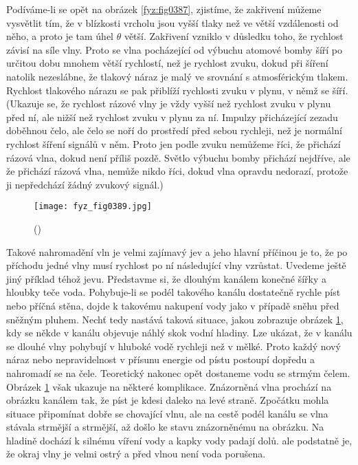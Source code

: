   Podíváme-li se opět na obrázek \ref{fyz:fig0387}, zjistíme, že zakřivení můžeme vysvětlit tím, že 
  v blízkosti vrcholu jsou vyšší tlaky než ve větší vzdálenosti od něho, a proto je tam úhel 
  \(\theta\) větší. Zakřivení vzniklo v důsledku toho, že rychlost závisí na síle vlny. Proto se 
  vlna pocházející od výbuchu atomové bomby šíří po určitou dobu mnohem větší rychlostí, než je 
  rychlost zvuku, dokud při šíření natolik nezeslábne, že tlakový náraz je malý ve srovnání s 
  atmosférickým tlakem. Rychlost tlakového nárazu se pak přiblíží rychlosti zvuku v plynu, v němž 
  se šíří. (Ukazuje se, že rychlost rázové vlny je vždy vyšší než rychlost zvuku v plynu před ní, 
  ale nižší než rychlost zvuku v plynu za ní. Impulzy přicházející zezadu doběhnou čelo, ale čelo 
  se noří do prostředí před sebou rychleji, než je normální rychlost šíření signálů v něm. Proto 
  jen podle zvuku nemůžeme říci, že přichází rázová vlna, dokud není příliš pozdě. Světlo výbuchu 
  bomby přichází nejdříve, ale že přichází rázová vlna, nemůže nikdo říci, dokud vlna opravdu 
  nedorazí, protože ji nepředchází žádný zvukový signál.)
  
  \begin{figure}[ht!] %
    \centering
    \texttt{[image: fyz\_fig0389.jpg]}
    \caption{
             (\cite[s.~689]{Feynman01})}
    \label{fyz:fig0389}
  \end{figure}
  
  Takové nahromadění vln je velmi zajímavý jev a jeho hlavní příčinou je to, že po příchodu jedné 
  vlny musí rychlost po ní následující vlny vzrůstat. Uvedeme ještě jiný příklad téhož jevu. 
  Představme si, že dlouhým kanálem konečné šířky a hloubky teče voda. Pohybuje-li se podél 
  takového kanálu dostatečně rychle píst nebo příčná stěna, dojde k takovému nakupení vody jako v 
  případě sněhu před sněžným pluhem. Nechť tedy nastává taková situace, jakou zobrazuje obrázek 
  \ref{fyz:fig0389}, kdy se někde v kanálu objevuje náhlý skok vodní hladiny. Lze ukázat, že v 
  kanálu se dlouhé vlny pohybují v hluboké vodě rychleji než v mělké. Proto každý nový náraz nebo 
  nepravidelnost v přísunu energie od pístu postoupí dopředu a nahromadí se na čele. Teoretický 
  nakonec opět dostaneme vodu se strmým čelem. Obrázek \ref{fyz:fig0389} však ukazuje na některé 
  komplikace. Znázorněná vlna prochází na obrázku kanálem tak, že píst je kdesi daleko na levé 
  straně. Zpočátku mohla situace připomínat dobře se chovající vlnu, ale na cestě podél kanálu se 
  vlna stávala strmější a strmější, až došlo ke stavu znázorněnému na obrázku. Na hladině dochází k 
  silnému víření vody a kapky vody padají dolů. ale podstatně je, že okraj vlny je velmi ostrý a 
  před vlnou není voda porušena.  
  
